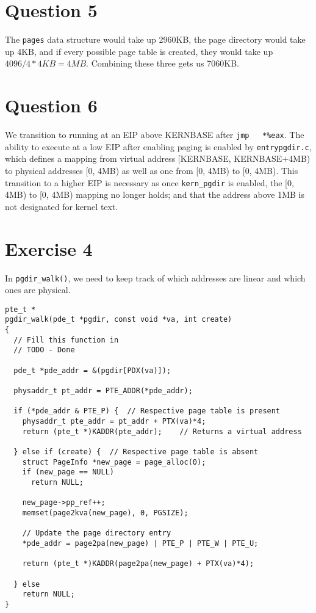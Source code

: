 \documentclass[]{article}
\begin{document}
\section*{Question 5}

The \verb|pages| data structure would take up 2960KB, the page directory would take up 4KB, and if every possible page table is created, they would take up $4096/4*4KB = 4MB$. Combining these three gets us 7060KB.

\section*{Question 6}
We transition to running at an EIP above KERNBASE after \verb|jmp	*%eax|. The ability to execute at a low EIP after enabling paging is enabled by \verb|entrypgdir.c|, which defines a mapping from virtual address [KERNBASE, KERNBASE+4MB) to physical addresses [0, 4MB) as well as one from [0, 4MB) to [0, 4MB). This transition to a higher EIP is necessary as once \verb|kern_pgdir| is enabled, the [0, 4MB) to [0, 4MB) mapping no longer holds; and that the address above 1MB is not designated for kernel text.

\section*{Exercise 4}

In \verb|pgdir_walk()|, we need to keep track of which addresses are linear and which ones are physical.

\begin{verbatim}
pte_t *
pgdir_walk(pde_t *pgdir, const void *va, int create)
{
  // Fill this function in
  // TODO - Done

  pde_t *pde_addr = &(pgdir[PDX(va)]);

  physaddr_t pt_addr = PTE_ADDR(*pde_addr);
  
  if (*pde_addr & PTE_P) {	// Respective page table is present
    physaddr_t pte_addr = pt_addr + PTX(va)*4;
    return (pte_t *)KADDR(pte_addr);	// Returns a virtual address

  } else if (create) {	// Respective page table is absent
    struct PageInfo *new_page = page_alloc(0);
    if (new_page == NULL)
      return NULL;

    new_page->pp_ref++;
    memset(page2kva(new_page), 0, PGSIZE);

    // Update the page directory entry
    *pde_addr = page2pa(new_page) | PTE_P | PTE_W | PTE_U;

    return (pte_t *)KADDR(page2pa(new_page) + PTX(va)*4);

  } else
    return NULL;
}
\end{verbatim}
\end{document}
